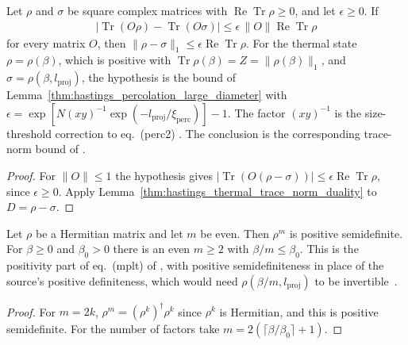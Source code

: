 \begin{theorem}
    \label{thm:hastings_thermal_trace_norm}
    \leanok
    Let $\rho$ and $\sigma$ be square complex matrices with
    $\operatorname{Re}\operatorname{Tr}\rho\ge0$, and let $\epsilon\ge0$. If
    \begin{align}
        |\operatorname{Tr}(O\rho)-\operatorname{Tr}(O\sigma)|
        \le\epsilon\,\|O\|\operatorname{Re}\operatorname{Tr}\rho
    \end{align}
    for every matrix $O$, then
    $\|\rho-\sigma\|_1\le\epsilon\operatorname{Re}\operatorname{Tr}\rho$. For the
    thermal state $\rho=\rho(\beta)$, which is positive with
    $\operatorname{Tr}\rho(\beta)=Z=\|\rho(\beta)\|_1$, and
    $\sigma=\rho(\beta,l_{\mathrm{proj}})$, the hypothesis is the bound of
    Lemma~\ref{thm:hastings_percolation_large_diameter} with
    $\epsilon=\exp[N(xy)^{-1}\exp(-l_{\mathrm{proj}}/\xi_{\mathrm{perc}})]-1$.
    The factor $(xy)^{-1}$ is the size-threshold correction to eq.~(perc2)
    \cite{gap:hastings05_percolation_cluster_size}. The conclusion is the
    corresponding trace-norm bound of \cite[lines 1281--1299]{Hastings2006Solving}.
\end{theorem}
\begin{proof}\leanok
    For $\|O\|\le1$ the hypothesis gives
    $|\operatorname{Tr}(O(\rho-\sigma))|\le\epsilon\operatorname{Re}\operatorname{Tr}\rho$,
    since $\epsilon\ge0$. Apply
    Lemma~\ref{thm:hastings_thermal_trace_norm_duality} to $D=\rho-\sigma$.
\end{proof}

\begin{lemma}
    \label{thm:hastings_even_powers}
    \leanok
    Let $\rho$ be a Hermitian matrix and let $m$ be even. Then $\rho^m$ is
    positive semidefinite. For $\beta\ge0$ and $\beta_0>0$ there is an even
    $m\ge2$ with $\beta/m\le\beta_0$. This is the positivity part of eq.~(mplt)
    of \cite[lines 1303--1317]{Hastings2006Solving}, with positive
    semidefiniteness in place of the source's positive definiteness, which would
    need $\rho(\beta/m,l_{\mathrm{proj}})$ to be
    invertible~\cite{gap:hastings05_mplt_positivity}.
\end{lemma}
\begin{proof}\leanok
    For $m=2k$, $\rho^m=(\rho^k)^\dagger\rho^k$ since $\rho^k$ is Hermitian, and
    this is positive semidefinite. For the number of factors take
    $m=2(\lceil\beta/\beta_0\rceil+1)$.
\end{proof}

